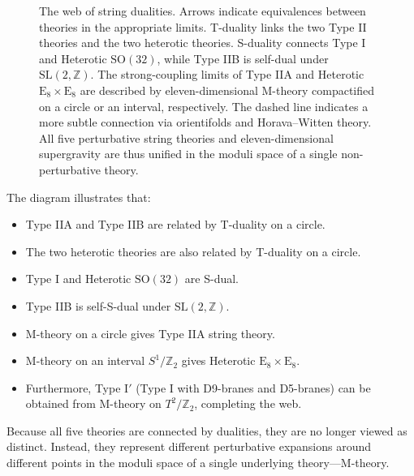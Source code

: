 \documentclass[11pt]{article}
\begin{document}
\begin{figure}[htbp]
\begin{tikzpicture}
\end{tikzpicture}
\caption{The web of string dualities. Arrows indicate equivalences between theories in the appropriate limits. T-duality links the two Type II theories and the two heterotic theories. S-duality connects Type I and Heterotic $\mathrm{SO}(32)$, while Type IIB is self-dual under $\mathrm{SL}(2,\mathbb{Z})$. The strong-coupling limits of Type IIA and Heterotic $\mathrm{E}_8\times\mathrm{E}_8$ are described by eleven-dimensional M-theory compactified on a circle or an interval, respectively. The dashed line indicates a more subtle connection via orientifolds and Horava--Witten theory. All five perturbative string theories and eleven-dimensional supergravity are thus unified in the moduli space of a single non-perturbative theory.}
\label{fig:dualityweb}
\end{figure}

The diagram illustrates that:
\begin{itemize}
    \item Type IIA and Type IIB are related by T-duality on a circle.
    \item The two heterotic theories are also related by T-duality on a circle.
    \item Type I and Heterotic $\mathrm{SO}(32)$ are S-dual.
    \item Type IIB is self-S-dual under $\mathrm{SL}(2,\mathbb{Z})$.
    \item M-theory on a circle gives Type IIA string theory.
    \item M-theory on an interval $S^1/\mathbb{Z}_2$ gives Heterotic $\mathrm{E}_8\times\mathrm{E}_8$.
    \item Furthermore, Type I$'$ (Type I with D9-branes and D5-branes) can be obtained from M-theory on $T^2/\mathbb{Z}_2$, completing the web.
\end{itemize}

Because all five theories are connected by dualities, they are no longer viewed as distinct. Instead, they represent different perturbative expansions around different points in the moduli space of a single underlying theory---M-theory.
\end{document}
